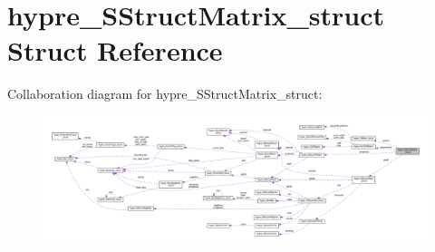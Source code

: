\hypertarget{structhypre__SStructMatrix__struct}{}\section{hypre\+\_\+\+S\+Struct\+Matrix\+\_\+struct Struct Reference}
\label{structhypre__SStructMatrix__struct}


Collaboration diagram for hypre\+\_\+\+S\+Struct\+Matrix\+\_\+struct\+:
\nopagebreak
\begin{figure}[H]
\begin{center}
\leavevmode
\includegraphics[width=350pt]{structhypre__SStructMatrix__struct__coll__graph}
\end{center}
\end{figure}

